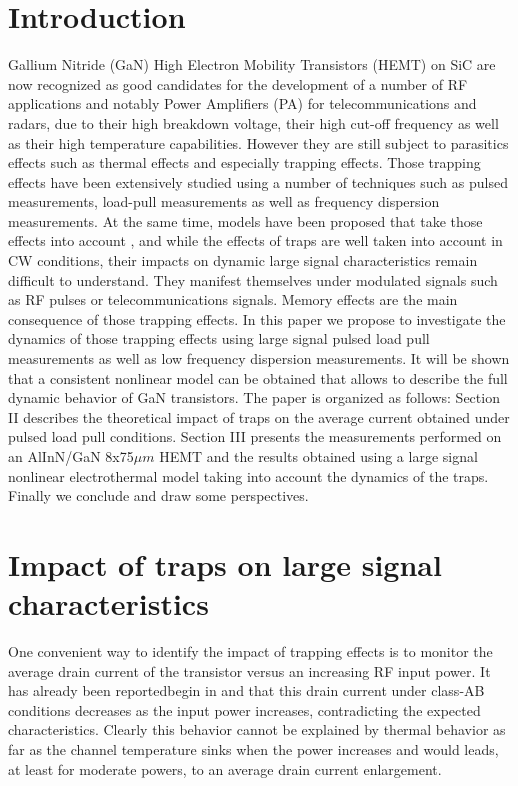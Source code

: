 \documentclass[conference]{IEEEtran}
\begin{document}
\IEEEpeerreviewmaketitle



\section{Introduction}
Gallium Nitride (GaN) High Electron Mobility Transistors (HEMT) on SiC are now recognized as good candidates for the development of a number of RF applications and notably Power Amplifiers (PA) for telecommunications and radars, due to their high breakdown voltage, their high cut-off frequency as well as their high temperature capabilities. However they are still subject to parasitics effects such as thermal effects and especially trapping effects. Those trapping effects have been extensively studied using a number of techniques such as pulsed measurements, load-pull measurements as well as frequency dispersion measurements. At the same time, models have been proposed that take those effects into account \cite{5296056, Leoni2001, 5516843}, and while the effects of traps are well taken into account in CW conditions, their impacts on dynamic large signal characteristics remain difficult to understand. They manifest themselves under modulated signals such as RF pulses or telecommunications signals. Memory effects are the main consequence of those trapping effects. In this paper we propose to investigate the dynamics of those trapping effects using large signal pulsed load pull measurements as well as low frequency dispersion measurements. It will be shown that a consistent nonlinear model can be obtained that allows to describe the full dynamic behavior of GaN transistors. The paper is organized as follows: Section II describes the theoretical impact of traps on the average current obtained under pulsed load pull conditions. Section III presents the measurements performed on an AlInN/GaN 8x75$\mu m$ HEMT and the results obtained using a large signal nonlinear electrothermal model taking into account the dynamics of the traps. Finally we conclude and draw some perspectives.



\section{Impact of traps on large signal characteristics}
One convenient way to identify the impact of trapping effects is to monitor the average drain current of the transistor versus an increasing RF input power. It has already been reportedbegin in \cite{5296056} and \cite{5516843} that this drain current under class-AB conditions decreases as the input power increases, contradicting the expected characteristics. Clearly this behavior cannot be explained by thermal behavior as far as the channel temperature sinks when the power increases and would leads, at least for moderate powers, to an average drain current enlargement.
\end{document}
